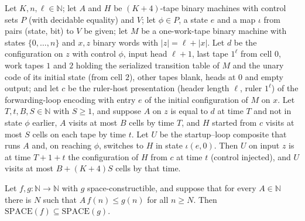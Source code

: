\begin{theorem}
\label{Complexity.f6_final_seam}
\leanok
{}
Let $K,n,\ell\in\mathbb{N}$; let $A$ and $H$ be $(K+4)$-tape binary machines with control sets $P$
(with decidable equality) and $V$; let $\phi\in P$, a state $e$ and a map $\iota$ from pairs
(state, bit) to $V$ be given; let $M$ be a one-work-tape binary machine with states
$\{0,\dots,n\}$ and $x,z$ binary words with $|z|=\ell+|x|$. Let $d$ be the configuration on $z$ with
control $\phi$, input head $\ell+1$, last tape $1^\ell$ from cell $0$, work tapes $1$ and $2$
holding the serialized transition table of $M$ and the unary code of its initial state (from cell
$2$), other tapes blank, heads at $0$ and empty output; and let $c$ be the ruler-host presentation
(header length $\ell$, ruler $1^\ell$) of the forwarding-loop encoding with entry $e$ of the
initial configuration of $M$ on $x$. Let $T,t,B,S\in\mathbb{N}$ with $S\ge 1$, and suppose $A$ on
$z$ is equal to $d$ at time $T$ and not in state $\phi$ earlier, $A$ visits at most $B$ cells by time
$T$, and $H$ started from $c$ visits at most $S$ cells on each tape by time $t$. Let $U$ be the
startup--loop composite that runs $A$ and, on reaching $\phi$, switches to $H$ in state
$\iota(e,0)$. Then $U$ on input $z$ is at time $T+1+t$ the configuration of $H$ from $c$ at time
$t$ (control injected), and $U$ visits at most $B+(K+4)S$ cells by that time.
\end{theorem}

\begin{lemma}
\label{Complexity.sph_inclusion}
\leanok
{}
Let $f,g:\mathbb{N}\to\mathbb{N}$ with $g$ space-constructible, and suppose that for every
$A\in\mathbb{N}$ there is $N$ such that $A\,f(n)\le g(n)$ for all $n\ge N$. Then
$\mathrm{SPACE}(f)\subseteq\mathrm{SPACE}(g)$.
\end{lemma}

